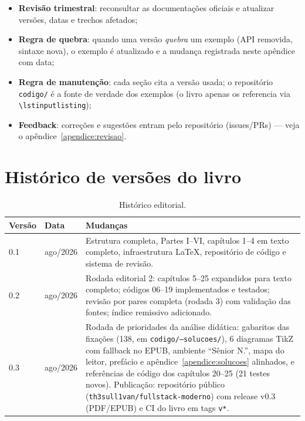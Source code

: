 \begin{itemize}[leftmargin=*, itemsep=0.4em]
  \item \textbf{Revisão trimestral}: reconsultar as documentações oficiais e
  atualizar versões, datas e trechos afetados;
  \item \textbf{Regra de quebra}: quando uma versão \emph{quebra} um exemplo
  (API removida, sintaxe nova), o exemplo é atualizado e a mudança registrada
  neste apêndice com data;
  \item \textbf{Regra de manutenção}: cada seção cita a versão usada; o
  repositório \texttt{codigo/} é a fonte de verdade dos exemplos (o livro
  apenas os referencia via \texttt{\textbackslash lstinputlisting});
  \item \textbf{Feedback}: correções e sugestões entram pelo repositório
  (issues/PRs) — veja o apêndice~\ref{apendice:revisao}.
\end{itemize}

\section{Histórico de versões do livro}

\begin{table}[h]
\centering
\small
\caption{Histórico editorial.}
\label{tab:historico}
\begin{tabularx}{\textwidth}{@{}l l X@{}}
\toprule
\textbf{Versão} & \textbf{Data} & \textbf{Mudanças} \\
\midrule
0.1 & ago/2026 & Estrutura completa, Partes I--VI, capítulos 1--4 em texto
completo, infraestrutura LaTeX, repositório de código e sistema de revisão. \\
0.2 & ago/2026 & Rodada editorial 2: capítulos 5--25 expandidos para texto
completo; códigos 06--19 implementados e testados; revisão por pares completa
(rodada 3) com validação das fontes; índice remissivo adicionado. \\
0.3 & ago/2026 & Rodada de prioridades da análise didática: gabaritos das
fixações (138, em \texttt{codigo/--solucoes/}), 6 diagramas TikZ com fallback
no EPUB, ambiente ``Sênior N.'', mapa do leitor, prefácio e apêndice~\ref{apendice:solucoes}
alinhados, e referências de código dos capítulos 20--25 (21 testes novos).
Publicação: repositório público (\texttt{th3sull1van/fullstack-moderno}) com
release v0.3 (PDF/EPUB) e CI do livro em tags \texttt{v*}. \\
\bottomrule
\end{tabularx}
\end{table}

